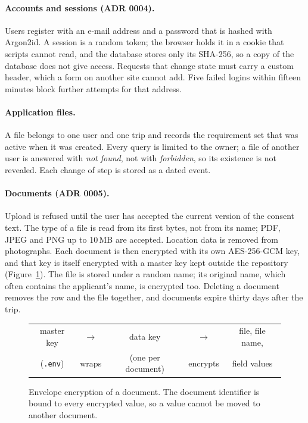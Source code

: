 \paragraph{Accounts and sessions (ADR 0004).} Users register with an e-mail address and a password
that is hashed with Argon2id. A session is a random token; the browser holds it in a cookie that
scripts cannot read, and the database stores only its SHA-256, so a copy of the database does not
give access. Requests that change state must carry a custom header, which a form on another site
cannot add. Five failed logins within fifteen minutes block further attempts for that address.

\paragraph{Application files.} A file belongs to one user and one trip and records the requirement
set that was active when it was created. Every query is limited to the owner; a file of another
user is answered with \emph{not found}, not with \emph{forbidden}, so its existence is not
revealed. Each change of step is stored as a dated event.

\paragraph{Documents (ADR 0005).} Upload is refused until the user has accepted the current
version of the consent text. The type of a file is read from its first bytes, not from its name;
PDF, JPEG and PNG up to 10\,MB are accepted. Location data is removed from photographs. Each
document is then encrypted with its own AES-256-GCM key, and that key is itself encrypted with a
master key kept outside the repository (Figure~\ref{fig:envelope}). The file is stored under a
random name; its original name, which often contains the applicant's name, is encrypted too.
Deleting a document removes the row and the file together, and documents expire thirty days after
the trip.

\begin{figure}[ht]
  \centering
  \small
  \begin{tabular}{@{}ccccc@{}}
    master key & $\rightarrow$ & data key & $\rightarrow$ & file, file name, \\
    (\texttt{.env}) & wraps & (one per document) & encrypts & field values \\
  \end{tabular}
  \caption{Envelope encryption of a document. The document identifier is bound to every
  encrypted value, so a value cannot be moved to another document.}
  \label{fig:envelope}
\end{figure}

